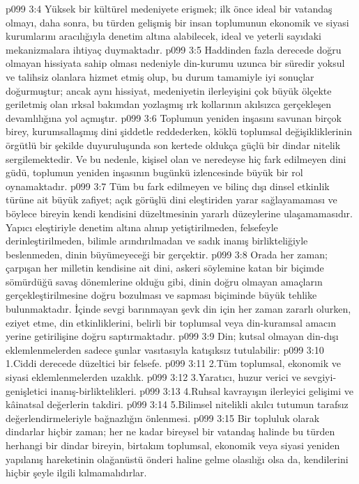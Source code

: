 \vs p099 3:4 Yüksek bir kültürel medeniyete erişmek; ilk önce ideal bir vatandaş olmayı, daha sonra, bu türden gelişmiş bir insan toplumunun ekonomik ve siyasi kurumlarını aracılığıyla denetim altına alabilecek, ideal ve yeterli sayıdaki mekanizmalara ihtiyaç duymaktadır.
\vs p099 3:5 Haddinden fazla derecede doğru olmayan hissiyata sahip olması nedeniyle din\hyp{}kurumu uzunca bir süredir yoksul ve talihsiz olanlara hizmet etmiş olup, bu durum tamamiyle iyi sonuçlar doğurmuştur; ancak aynı hissiyat, medeniyetin ilerleyişini çok büyük ölçekte geriletmiş olan ırksal bakımdan yozlaşmış ırk kollarının akılsızca gerçekleşen devamlılığına yol açmıştır.
\vs p099 3:6 Toplumun yeniden inşasını savunan birçok birey, kurumsallaşmış dini şiddetle reddederken, köklü toplumsal değişikliklerinin örgütlü bir şekilde duyuruluşunda son kertede oldukça güçlü bir dindar nitelik sergilemektedir. Ve bu nedenle, kişisel olan ve neredeyse hiç fark edilmeyen dini güdü, toplumun yeniden inşasının bugünkü izlencesinde büyük bir rol oynamaktadır.
\vs p099 3:7 Tüm bu fark edilmeyen ve bilinç dışı dinsel etkinlik türüne ait büyük zafiyet; açık görüşlü dini eleştiriden yarar sağlayamaması ve böylece bireyin kendi kendisini düzeltmesinin yararlı düzeylerine ulaşamamasıdır. Yapıcı eleştiriyle denetim altına alınıp yetiştirilmeden, felsefeyle derinleştirilmeden, bilimle arındırılmadan ve sadık inanış birlikteliğiyle beslenmeden, dinin büyümeyeceği bir gerçektir.
\vs p099 3:8 Orada her zaman; çarpışan her milletin kendisine ait dini, askeri söylemine katan bir biçimde sömürdüğü savaş dönemlerine olduğu gibi, dinin doğru olmayan amaçların gerçekleştirilmesine doğru bozulması ve sapması biçiminde büyük tehlike bulunmaktadır. İçinde sevgi barınmayan şevk din için her zaman zararlı olurken, eziyet etme, din etkinliklerini, belirli bir toplumsal veya din\hyp{}kuramsal amacın yerine getirilişine doğru saptırmaktadır.
\vs p099 3:9 Din; kutsal olmayan din\hyp{}dışı eklemlenmelerden sadece şunlar vasıtasıyla katışıksız tutulabilir:
\vs p099 3:10 1.\bibnobreakspace Ciddi derecede düzeltici bir felsefe.
\vs p099 3:11 2.\bibnobreakspace Tüm toplumsal, ekonomik ve siyasi eklemlenmelerden uzaklık.
\vs p099 3:12 3.\bibnobreakspace Yaratıcı, huzur verici ve sevgiyi\hyp{}genişletici inanış\hyp{}birliktelikleri.
\vs p099 3:13 4.\bibnobreakspace Ruhsal kavrayışın ilerleyici gelişimi ve kâinatsal değerlerin takdiri.
\vs p099 3:14 5.\bibnobreakspace Bilimsel nitelikli akılcı tutumun tarafsız değerlendirmeleriyle bağnazlığın önlenmesi.
\vs p099 3:15 Bir topluluk olarak dindarlar hiçbir zaman; her ne kadar bireysel bir vatandaş halinde bu türden herhangi bir dindar bireyin, birtakım toplumsal, ekonomik veya siyasi yeniden yapılanış hareketinin olağanüstü önderi haline gelme olasılığı olsa da,  kendilerini hiçbir şeyle ilgili kılmamalıdırlar.
